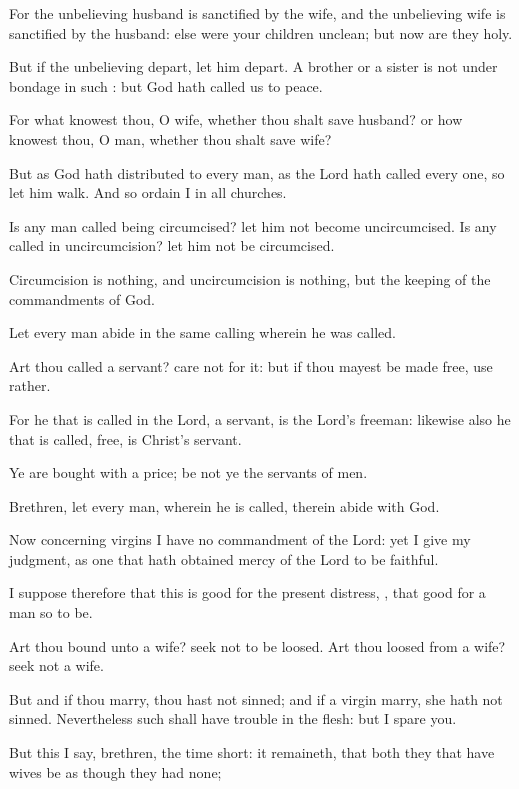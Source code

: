 {For the
unbelieving
husband is
sanctified
by the
wife,
and the
unbelieving
wife is
sanctified
by the
husband:
else
were
your
children
unclean;
but
now are
they
holy.

But
if the
unbelieving
depart, let him
depart. A
brother
or a
sister
is
not under
bondage
in
such
{}:
but
God hath
called
us
to
peace.

For
what knowest
thou, O
wife,
whether thou shalt
save
{}
husband?
or
how knowest
thou, O
man,
whether thou shalt
save
{}
wife?

But
as
God hath
distributed to every
man,
as the
Lord hath
called every
one,
so let him
walk.
And
so ordain
I
in
all
churches.

Is any
man
called being
circumcised? let
him
not become
uncircumcised.
Is
any
called
in
uncircumcision? let
him
not be
circumcised.

Circumcision
is
nothing,
and
uncircumcision
is
nothing,
but the
keeping of the
commandments of
God.

Let every
man
abide
in the
same
calling
wherein he was
called.

Art thou
called
{} a
servant?
care
not for
it:
but
if thou
mayest be
made
free,
use
{}
rather.

For he
that is
called
in the
Lord,
{} a
servant,
is the
Lord’s
freeman:
likewise
also he
that is
called,
{}
free,
is
Christ’s
servant.

Ye are
bought with a
price;
be
not
ye the
servants of
men.

Brethren, let every
man,
wherein he is
called,
therein
abide
with
God.


\par }{\PP {}Now
concerning
virgins I
have
no
commandment of the
Lord:
yet I
give my
judgment,
as one that hath obtained
mercy
of the
Lord to
be
faithful.

I
suppose
therefore that
this
is
good
for the
present
distress,
{},
that
{}
good for a
man
so to
be.

Art thou
bound unto a
wife?
seek
not to be
loosed. Art thou
loosed
from a
wife?
seek
not a
wife.

But
and
if thou
marry, thou
hast
not
sinned;
and
if a
virgin
marry, she
hath
not
sinned.
Nevertheless
such shall
have
trouble in the
flesh:
but
I
spare
you.

But
this I
say,
brethren, the
time
{}
short: it
remaineth,
that
both they
that
have
wives be
as
though they
had
none;

}
